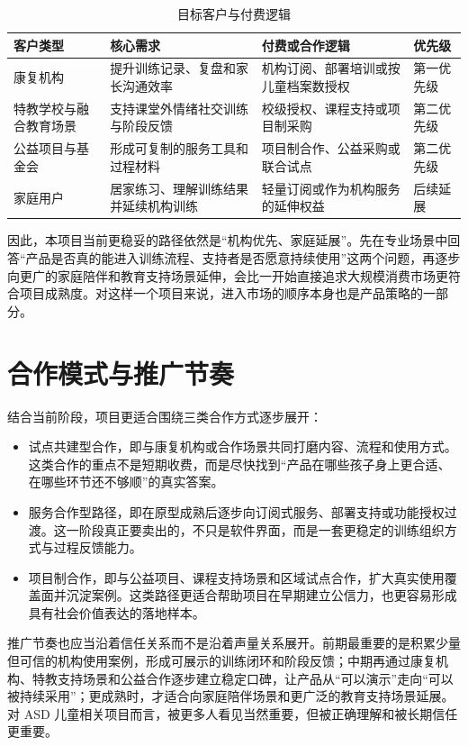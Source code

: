 \begin{table}[H]
\centering
\caption{目标客户与付费逻辑}
\small
\begin{tabularx}{0.98\textwidth}{>{\raggedright\arraybackslash}p{} >{\raggedright\arraybackslash}p{} >{\raggedright\arraybackslash}p{} X}
\toprule
客户类型 & 核心需求 & 付费或合作逻辑 & 优先级 \\
\midrule
康复机构 & 提升训练记录、复盘和家长沟通效率 & 机构订阅、部署培训或按儿童档案数授权 & 第一优先级 \\
特教学校与融合教育场景 & 支持课堂外情绪社交训练与阶段反馈 & 校级授权、课程支持或项目制采购 & 第二优先级 \\
公益项目与基金会 & 形成可复制的服务工具和过程材料 & 项目制合作、公益采购或联合试点 & 第二优先级 \\
家庭用户 & 居家练习、理解训练结果并延续机构训练 & 轻量订阅或作为机构服务的延伸权益 & 后续延展 \\
\bottomrule
\end{tabularx}
\end{table}

因此，本项目当前更稳妥的路径依然是“机构优先、家庭延展”。先在专业场景中回答“产品是否真的能进入训练流程、支持者是否愿意持续使用”这两个问题，再逐步向更广的家庭陪伴和教育支持场景延伸，会比一开始直接追求大规模消费市场更符合项目成熟度。对这样一个项目来说，进入市场的顺序本身也是产品策略的一部分。

\section{合作模式与推广节奏}
结合当前阶段，项目更适合围绕三类合作方式逐步展开：

\begin{itemize}
  \item 试点共建型合作，即与康复机构或合作场景共同打磨内容、流程和使用方式。这类合作的重点不是短期收费，而是尽快找到“产品在哪些孩子身上更合适、在哪些环节还不够顺”的真实答案。
  \item 服务合作型路径，即在原型成熟后逐步向订阅式服务、部署支持或功能授权过渡。这一阶段真正要卖出的，不只是软件界面，而是一套更稳定的训练组织方式与过程反馈能力。
  \item 项目制合作，即与公益项目、课程支持场景和区域试点合作，扩大真实使用覆盖面并沉淀案例。这类路径更适合帮助项目在早期建立公信力，也更容易形成具有社会价值表达的落地样本。
\end{itemize}

推广节奏也应当沿着信任关系而不是沿着声量关系展开。前期最重要的是积累少量但可信的机构使用案例，形成可展示的训练闭环和阶段反馈；中期再通过康复机构、特教支持场景和公益合作逐步建立稳定口碑，让产品从“可以演示”走向“可以被持续采用”；更成熟时，才适合向家庭陪伴场景和更广泛的教育支持场景延展。对 ASD 儿童相关项目而言，被更多人看见当然重要，但被正确理解和被长期信任更重要。

